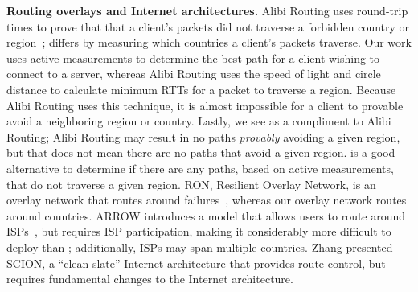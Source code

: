 {\bf Routing overlays and Internet architectures.} Alibi Routing uses
round-trip times to prove that that a client's packets did  not traverse a
forbidden country or region~\cite{levin2015alibi,levin_detour}; \system{} differs by
measuring  which countries a client's packets traverse.  Our
work uses active measurements to determine the best path for a client
wishing  to connect to a server, whereas Alibi Routing uses the speed of light and 
circle distance to calculate minimum RTTs for a packet to traverse a region.  Because Alibi Routing 
uses this technique, it is almost impossible for a client to provable avoid a neighboring region or country.  
Lastly, we see \system{} as a compliment to Alibi Routing; Alibi Routing may result in no paths {\it provably} avoiding 
a given region, but that does not mean there are no paths that avoid a given region.  \system{} is a good alternative 
to determine if there are any paths, based on active measurements, that do not traverse a given region.  RON, Resilient Overlay Network, is an
overlay network that  routes around failures~\cite{andersen2001resilient}, whereas our overlay network
routes around countries.  ARROW introduces a
model that allows users to route around ISPs~\cite{peter2015one}, but requires
ISP participation, making it considerably more difficult to deploy than
\system{}; additionally, ISPs may span multiple countries. %
Zhang \ea{} presented SCION, a ``clean-slate'' Internet architecture that
provides route control, but requires fundamental
changes to the Internet architecture. %

